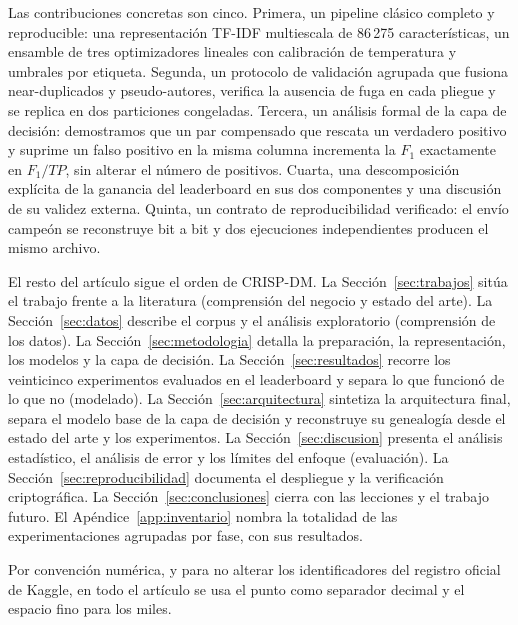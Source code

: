 Las contribuciones concretas son cinco. Primera, un pipeline clásico
completo y reproducible: una representación TF-IDF multiescala de 86\,275
características, un ensamble de tres optimizadores lineales con calibración
de temperatura y umbrales por etiqueta. Segunda, un protocolo de validación
agrupada que fusiona near-duplicados y pseudo-autores, verifica la ausencia
de fuga en cada pliegue y se replica en dos particiones congeladas. Tercera,
un análisis formal de la capa de decisión: demostramos que un par compensado
que rescata un verdadero positivo y suprime un falso positivo en la misma
columna incrementa la $F_1$ exactamente en $F_1/TP$, sin alterar el número de
positivos. Cuarta, una descomposición explícita de la ganancia del
leaderboard en sus dos componentes y una discusión de su validez externa.
Quinta, un contrato de reproducibilidad verificado: el envío campeón se
reconstruye bit a bit y dos ejecuciones independientes producen el mismo
archivo.

El resto del artículo sigue el orden de CRISP-DM. La
Sección~\ref{sec:trabajos} sitúa el trabajo frente a la literatura
(comprensión del negocio y estado del arte). La Sección~\ref{sec:datos}
describe el corpus y el análisis exploratorio (comprensión de los datos). La
Sección~\ref{sec:metodologia} detalla la preparación, la representación, los
modelos y la capa de decisión. La Sección~\ref{sec:resultados} recorre los
veinticinco experimentos evaluados en el leaderboard y separa lo que funcionó
de lo que no (modelado). La Sección~\ref{sec:arquitectura} sintetiza la
arquitectura final, separa el modelo base de la capa de decisión y reconstruye
su genealogía desde el estado del arte y los experimentos. La
Sección~\ref{sec:discusion} presenta el análisis
estadístico, el análisis de error y los límites del enfoque (evaluación). La
Sección~\ref{sec:reproducibilidad} documenta el despliegue y la verificación
criptográfica. La Sección~\ref{sec:conclusiones} cierra con las lecciones y
el trabajo futuro. El Apéndice~\ref{app:inventario} nombra la totalidad de las
experimentaciones agrupadas por fase, con sus resultados.

Por convención numérica, y para no alterar los identificadores del registro
oficial de Kaggle, en todo el artículo se usa el punto como separador decimal
y el espacio fino para los miles.
